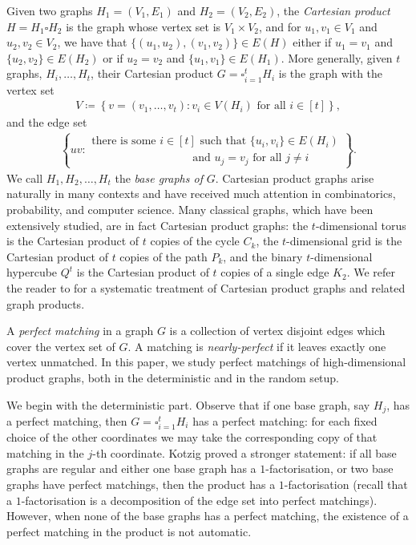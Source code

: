 \documentclass[notitlepage]{scrartcl}
\begin{document}
Given two graphs $H_1=(V_1,E_1)$ and $H_2=(V_2,E_2)$, the \textit{Cartesian product} $H=H_1\square H_2$ is the graph whose vertex set is $V_1\times V_2$, and for $u_1,v_1\in V_1$ and $u_2,v_2\in V_2$, we have that $\{(u_1,u_2),(v_1,v_2)\}\in E(H)$ either if $u_1=v_1$ and $\{u_2,v_2\}\in E(H_2)$ or if $u_2=v_2$ and $\{u_1,v_1\}\in E(H_1)$. More generally, given $t$ graphs, $H_i,\ldots, H_t$, their Cartesian product $G=\square_{i=1}^tH_i$ is the graph with the vertex set
\begin{align*}
    V\coloneqq \left\{v=(v_1,\ldots, v_t)\colon v_i\in V(H_i)\text{ for all } i\in[t]\right\},
\end{align*}
and the edge set
\begin{align*}
  \left\{uv \colon \begin{array}{l} \text{there is some } i\in [t] \text{ such that }  \{u_i,v_i\}\in E\left(H_i\right)\\
   \qquad\qquad\qquad\quad\qquad \text{and } u_j=v_j \text{ for all } j \neq i \end{array}\right\}.
\end{align*}
We call $H_1,H_2,\ldots, H_t$ the \textit{base graphs of} $G$. Cartesian product graphs arise naturally in many contexts and have received much attention in combinatorics, probability, and computer science. Many classical graphs, which have been extensively studied, are in fact Cartesian product graphs: the $t$-dimensional torus is the Cartesian product of $t$ copies of the cycle $C_k$, the $t$-dimensional grid is the Cartesian product of $t$ copies of the path $P_k$, and the binary $t$-dimensional hypercube $Q^t$ is the Cartesian product of $t$ copies of a single edge $K_2$.
We refer the reader to \cite{HIK11} for a systematic treatment of Cartesian product graphs and related graph products.

A \emph{perfect matching} in a graph $G$ is a collection of vertex disjoint edges which cover the vertex set of $G$. A matching is \emph{nearly-perfect} if it leaves exactly one vertex unmatched. In this paper, we study perfect matchings of high-dimensional product graphs, both in the deterministic and in the random setup. 

We begin with the deterministic part. Observe that if one base graph, say $H_j$, has a perfect matching, then $G=\square_{i=1}^tH_i$ has a perfect matching: for each fixed choice of the other coordinates we may take the corresponding copy of that matching in the $j$-th coordinate.
Kotzig \cite{K79} proved a stronger statement: if all base graphs are regular and either one base graph has a $1$-factorisation, or two base graphs have perfect matchings, then the product has a $1$-factorisation (recall that a $1$-factorisation is a decomposition of the edge set into perfect matchings).
However, when none of the base graphs has a perfect matching, the existence of a perfect matching in the product is not automatic.
\end{document}
